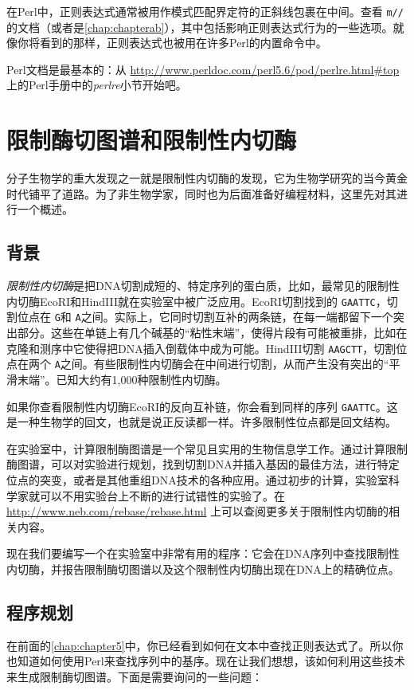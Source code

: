 在Perl中，正则表达式通常被用作模式匹配界定符的正斜线包裹在中间。查看 \verb|m//|的文档（或者是\autoref{chap:chapterab}），其中包括影响正则表达式行为的一些选项。就像你将看到的那样，正则表达式也被用在许多Perl的内置命令中。

Perl文档是最基本的：从 \href{http://www.perldoc.com/perl5.6/pod/perlre.html\#top}{http://www.perldoc.com/perl5.6/pod/perlre.html\#top} 上的Perl手册中的\textit{perlre}小节开始吧。

\section{限制酶切图谱和限制性内切酶}
分子生物学的重大发现之一就是限制性内切酶的发现，它为生物学研究的当今黄金时代铺平了道路。为了非生物学家，同时也为后面准备好编程材料，这里先对其进行一个概述。

\subsection{背景}
\textit{限制性内切酶}是把DNA切割成短的、特定序列的蛋白质，比如，最常见的限制性内切酶EcoRI和HindIII就在实验室中被广泛应用。EcoRI切割找到的 \verb|GAATTC|，切割位点在 \verb|G|和 \verb|A|之间。实际上，它同时切割互补的两条链，在每一端都留下一个突出部分。这些在单链上有几个碱基的“粘性末端”，使得片段有可能被重排，比如在克隆和测序中它使得把DNA插入倒载体中成为可能。HindIII切割 \verb|AAGCTT|，切割位点在两个 \verb|A|之间。有些限制性内切酶会在中间进行切割，从而产生没有突出的“平滑末端”。已知大约有1,000种限制性内切酶。

如果你查看限制性内切酶EcoRI的反向互补链，你会看到同样的序列 \verb|GAATTC|。这是一种生物学的回文，也就是说正反读都一样。许多限制性位点都是回文结构。

在实验室中，计算限制酶图谱是一个常见且实用的生物信息学工作。通过计算限制酶图谱，可以对实验进行规划，找到切割DNA并插入基因的最佳方法，进行特定位点的突变，或者是其他重组DNA技术的各种应用。通过初步的计算，实验室科学家就可以不用实验台上不断的进行试错性的实验了。在 \href{http://www.neb.com/rebase/rebase.html}{http://www.neb.com/rebase/rebase.html} 上可以查阅更多关于限制性内切酶的相关内容。

现在我们要编写一个在实验室中非常有用的程序：它会在DNA序列中查找限制性内切酶，并报告限制酶切图谱以及这个限制性内切酶出现在DNA上的精确位点。

\subsection{程序规划}
在前面的\autoref{chap:chapter5}中，你已经看到如何在文本中查找正则表达式了。所以你也知道如何使用Perl来查找序列中的基序。现在让我们想想，该如何利用这些技术来生成限制酶切图谱。下面是需要询问的一些问题：

